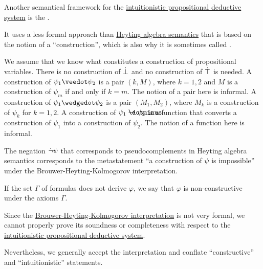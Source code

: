 \begin{concept}\label{con:brouwer_heyting_kolmogorov_interpretation}
  Another semantical framework for the \hyperref[def:intuitionistic_propositional_deduction_systems]{intuitionistic propositional deductive system} is the .

  It uses a less formal approach than \hyperref[def:propositional_heyting_algebra_semantics]{Heyting algebra semantics} that is based on the notion of a \enquote{construction}, which is also why it is sometimes called .

  \begin{thmenum}
     We assume that we know what constitutes a construction of propositional variables.
     There is no construction of \( \dot\bot \) and no construction of \( \dot\top \) is needed.
     A construction of \( \psi_1 \synvee \psi_2 \) is a pair \( (k, M) \), where \( k = 1, 2 \) and \( M \) is a construction of \( \psi_m \) if and only if \( k = m \). The notion of a pair here is informal.
     A construction of \( \psi_1 \synwedge \psi_2 \) is a pair \( (M_1, M_2) \), where \( M_k \) is a construction of \( \psi_k \) for \( k = 1, 2 \).
     A construction of \( \psi_1 \synimplies \psi_2 \) is a function that converts a construction of \( \psi_1 \) into a construction of \( \psi_2 \). The notion of a function here is informal.
  \end{thmenum}

  The negation \( \dot\neg\psi \) that corresponds to pseudocomplements in Heyting algebra semantics corresponds to the metastatement \enquote{a construction of \( \psi \) is impossible} under the Brouwer-Heyting-Kolmogorov interpretation.

  If the set \( \Gamma \) of formulas does not derive \( \varphi \), we say that \( \varphi \) is non-constructive under the axioms \( \Gamma \).
\end{concept}

\begin{remark}\label{rem:brouwer_heyting_kolmogorov_interpretation_compatibility}
  Since the \hyperref[con:brouwer_heyting_kolmogorov_interpretation]{Brouwer-Heyting-Kolmogorov interpretation} is not very formal, we cannot properly prove its soundness or completeness with respect to the \hyperref[def:intuitionistic_propositional_deduction_systems]{intuitionistic propositional deductive system}.

  Nevertheless, we generally accept the interpretation and conflate \enquote{constructive} and \enquote{intuitionistic} statements.
\end{remark}

